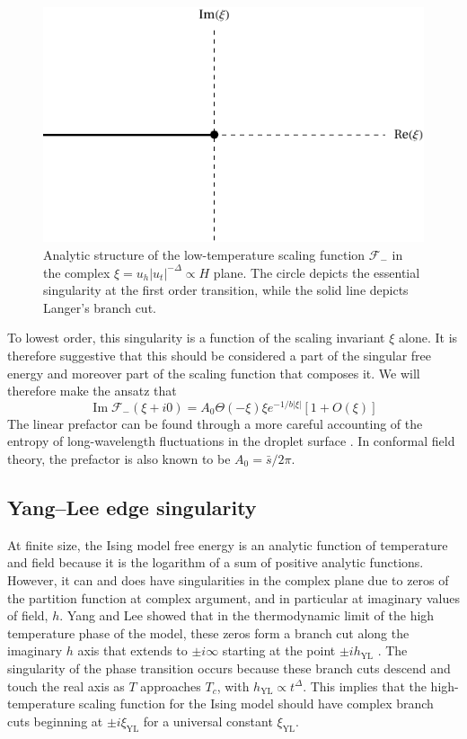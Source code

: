 \documentclass[
aps,
pre,
preprint,
longbibliography,
floatfix
]{revtex4-2}
\begin{document}
\begin{figure}
  \includegraphics{figs/F_lower_singularities.pdf}
  \caption{
    Analytic structure of the low-temperature scaling function $\mathcal F_-$
    in the complex $\xi=u_h|u_t|^{-\Delta}\propto H$ plane. The circle
    depicts the essential singularity at the first order transition, while the
    solid line depicts Langer's branch cut.
  } \label{fig:lower.singularities}
\end{figure}

To lowest order, this singularity is a function of the scaling invariant $\xi$
alone. It is therefore suggestive that this should be considered a part of the
singular free energy and moreover part of the scaling function that composes
it. We will therefore make the ansatz that
\begin{equation} \label{eq:essential.singularity}
  \operatorname{Im}\mathcal F_-(\xi+i0)=A_0\Theta(-\xi)\xi e^{-1/b|\xi|}\left[1+O(\xi)\right]
\end{equation}
\cite{Houghton_1980_The}
The linear prefactor can be found through a more careful accounting of the
entropy of long-wavelength fluctuations in the droplet surface
\cite{Gunther_1980_Goldstone}. In conformal field theory, the prefactor is also known to be $A_0=\bar s/2\pi$.

\subsection{Yang--Lee edge singularity}

At finite size, the Ising model free energy is an analytic function of
temperature and field because it is the logarithm of a sum of positive analytic
functions. However, it can and does have singularities in the complex plane due
to zeros of the partition function at complex argument, and in particular at
imaginary values of field, $h$. Yang and Lee showed that in the thermodynamic
limit of the high temperature phase of the model, these zeros form a branch cut
along the imaginary $h$ axis that extends to $\pm i\infty$ starting at the
point $\pm ih_{\mathrm{YL}}$ \cite{Yang_1952_Statistical, Lee_1952_Statistical}.
The singularity of the phase transition occurs because these branch cuts
descend and touch the real axis as $T$ approaches $T_c$, with
$h_{\mathrm{YL}}\propto t^{\Delta}$. This implies that the
high-temperature scaling function for the Ising model should have complex
branch cuts beginning at $\pm i\xi_{\mathrm{YL}}$ for a universal constant
$\xi_{\mathrm{YL}}$.
\end{document}
